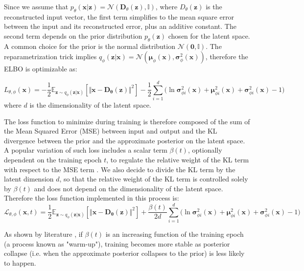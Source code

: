 Since we assume that $p_\theta(\mathbf{x}|\mathbf{z})=
\mathcal{N}\left(\mathbf{D}_\theta(\mathbf{z}), \mathbb{I}\right)$, 
where $D_\theta(\mathbf{z})$ is the reconstructed input vector, 
the first term simplifies to the mean square error between the input and its
reconstructed error, plus an additive constant. 
The second term depends on the prior distribution $p_\theta(\mathbf{z})$ 
chosen for the latent space.
A common choice for the prior is the normal distribution 
$\mathcal{N}(\mathbf{0}, \mathbb{I})$. 
The reparametrization trick implies $q_\phi(\mathbf{z}|\mathbf{x}) = 
\mathcal{N}(\mathbf{\mu}_\phi(\mathbf{x}),
\mathbf{\sigma}^2_\phi(\mathbf{x}))$, therefore the ELBO is
optimizable as:

\begin{equation}    \label{ELBO-theoretical}
    L_{\theta, \phi}(\mathbf{x})=
    -\frac{1}{2}\mathbb{E}_{\mathbf{z}\sim q_\phi(\mathbf{z}|\mathbf{x})}
    \left[\Vert\mathbf{x} - \mathbf{D_\theta(\mathbf{z})}\Vert^2\right] - 
    \frac{1}{2} \sum_{i=1}^{d} \Big( \ln\mathbf{\sigma}_{\phi i}^2(\mathbf{x})
    + \mathbf{\mu}_{\phi i}^2(\mathbf{x}) +
    \mathbf{\sigma}_{\phi i}^2(\mathbf{x}) - 1\Big)
\end{equation}
where $d$ is the dimensionality of the latent space.

The loss function to minimize during training is therefore composed of the
sum of the Mean Squared Error (MSE) between input and output and the KL
divergence between the prior and the approximate posterior on the latent space.
A popular variation of such loss includes a scalar term $\beta(t)$,
optionally dependent on the training epoch $t$, to regulate the relative weight
of the KL term with respect to the MSE term \cite{vae-beta-original}.
We also decide to divide the KL term by the latent dimension $d$, so that
the relative weight of the KL term is controlled solely by $\beta(t)$ and does 
not depend on the dimensionality of the latent space.
Therefore the loss function implemented in this process is:
\begin{equation}
    \mathcal{L}_{\theta, \phi}(\mathbf{x},t)=
    \frac{1}{2}\mathbb{E}_{\mathbf{z}\sim q_{\phi}(\mathbf{z}|\mathbf{x})}
    \left[\Vert\mathbf{x} - \mathbf{D_\theta(\mathbf{z})}\Vert^2\right] + 
    \frac{\beta(t)}{2d} \sum_{i=1}^{d} \Big( \ln\mathbf{\sigma}_{\phi i}^2
    (\mathbf{x})
    + \mathbf{\mu}_{\phi i}^2(\mathbf{x}) +
    \mathbf{\sigma}_{\phi i}^2(\mathbf{x}) - 1 \Big)
\end{equation}

As shown by literature \cite{vae-beta}, if $\beta(t)$ is an increasing function 
of the training epoch (a process known as "warm-up"), training becomes more 
stable as posterior collapse (i.e. when the approximate posterior collapses to 
the prior) is less likely to happen.

